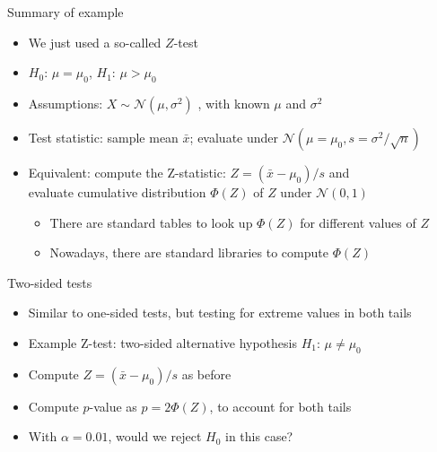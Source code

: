 \begin{frame}[c]{Summary of example}

\begin{itemize}
\item We just used a so-called \alert{$Z$-test}
\item $H_0$: $\mu=\mu_0$, $H_1$: $\mu>\mu_0$  
\item Assumptions: $X \sim \mathcal{N}(\mu,\sigma^2)$ , with known $\mu$ and $\sigma^2$

\medskip
\pause
\item \alert{Test statistic}: sample mean $\bar{x}$; evaluate under 
$\mathcal{N}(\mu=\mu_0,s=\sigma^2/\sqrt{n})$
\pause
\smallskip
\item Equivalent: compute the \alert{Z-statistic}: $Z = (\bar{x}-\mu_0)/s$
and\\
evaluate cumulative distribution $\Phi(Z)$ of $Z$
under $\mathcal{N}(0,1)$
\medskip
\pause
\begin{itemize}
\item There are standard tables to look up $\Phi(Z)$ for different values of $Z$
\item Nowadays, there are standard libraries to compute $\Phi(Z)$
\end{itemize}

\end{itemize}

\end{frame}
\begin{frame}[c]{Two-sided tests}


\vspace*{-0.2cm}
\begin{center}

\end{center}
\vspace*{-0.2cm}

\begin{itemize}
\item Similar to one-sided tests, but testing for extreme values in both tails
\item Example Z-test: two-sided alternative hypothesis $H_1$:
$\mu \neq \mu_0$
\pause
\smallskip
\item Compute $Z = (\bar{x}-\mu_0)/s$ as before
\item Compute $p$-value as $p = 2\Phi(Z)$, to account for both tails
\pause 
\medskip
\item With $\alpha = 0.01$, would we reject $H_0$ in this case? \hands
\end{itemize}

\end{frame}
